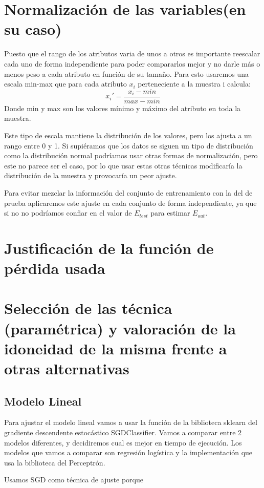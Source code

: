 \documentclass{article}
\begin{document}
	
	\section{Normalización de las variables(en su caso)} %
	Puesto que el rango de los atributos varia de unos a otros es importante reescalar cada uno de forma independiente para poder compararlos mejor y no darle más o menos peso a cada atributo en función de su tamaño. Para esto usaremos una escala min-max que para cada atributo $x_i$ perteneciente a la muestra i calcula:
\begin{equation}
x_i' = \frac{x_i-min}{max-min}
\end{equation}
\indent Donde min y max son los valores mínimo y máximo del atributo en toda la muestra.
\par 
Este tipo de escala mantiene la distribución de los valores, pero los ajusta a un rango entre 0 y 1.  Si supiéramos que los datos se siguen un tipo de distribución como la distribución normal podríamos usar otras formas de normalización, pero este no parece ser el caso, por lo que usar estas otras técnicas modificaría la distribución de la muestra y provocaría un peor ajuste.
\par 
Para evitar mezclar la información del conjunto de entrenamiento con la del de prueba aplicaremos este ajuste en cada conjunto de forma independiente, ya que si no no podríamos confiar en el valor de $E_{test}$ para estimar $E_{out}$.
	
	
	\section{Justificación de la función de pérdida usada} %
	
	
	
	\section{Selección de las técnica (paramétrica) y valoración de la idoneidad de la misma frente a otras alternativas} %
	\subsection{Modelo Lineal}
	Para ajustar el modelo lineal vamos a usar la función de la biblioteca sklearn del gradiente descendente estocástico SGDClassifier. Vamos a comparar entre 2 modelos diferentes, y decidiremos cual es mejor en tiempo de ejecución. Los modelos que vamos a comparar son regresión logística y la implementación que usa la biblioteca del Perceptrón.
	\par 
	Usamos SGD como técnica	de ajuste porque %
\end{document}
